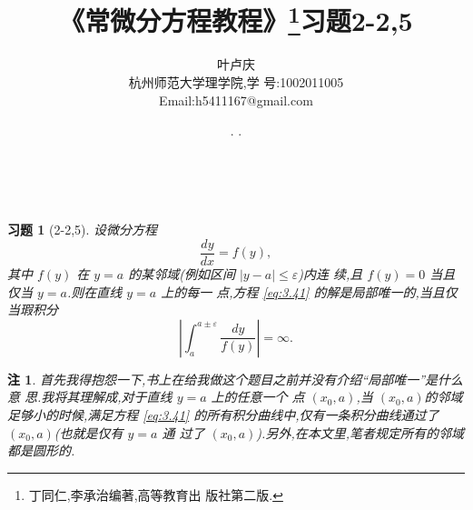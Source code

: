 \documentclass[a4paper, 12pt]{article} %
\makeatletter
\newtheorem*{cdtheorem}{习题}
\newenvironment{exercise}
{\bigskip\begin{mdframed}[backgroundcolor=gray!40,rightline=false,leftline=false,topline=false,bottomline=false]\begin{cdtheorem}}
    {\end{cdtheorem}\end{mdframed}\bigskip}
\newtheorem{ddtheorem}{注}
\newenvironment{remark}
{\bigskip\begin{mdframed}[backgroundcolor=gray!40,rightline=false,leftline=false,topline=false,bottomline=false]\begin{ddtheorem}}
    {\end{ddtheorem}\end{mdframed}\bigskip}
\renewcommand{\maketitle}{ %
  \renewcommand\refname{参考文献}
  \newcommand{\D}{\displaystyle}\newcommand{\ri}{\Rightarrow}
  \newcommand{\ds}{\displaystyle} \renewcommand{\ni}{\noindent}
  \newcommand{\pa}{\partial} \newcommand{\Om}{\Omega}
  \newcommand{\om}{\omega} \newcommand{\sik}{\sum_{i=1}^k}
  \newcommand{\vov}{\Vert\omega\Vert} \newcommand{\Umy}{U_{\mu_i,y^i}}
  \newcommand{\lamns}{\lambda_n^{^{\scriptstyle\sigma}}}
  \newcommand{\chiomn}{\chi_{_{\Omega_n}}}
  \newcommand{\ullim}{\underline{\lim}} \newcommand{\bsy}{\boldsymbol}
  \newcommand{\mvb}{\mathversion{bold}} \newcommand{\la}{\lambda}
  \newcommand{\La}{\Lambda} \newcommand{\va}{\varepsilon}
  \newcommand{\be}{\beta} \newcommand{\al}{\alpha}
  \newcommand{\dis}{\displaystyle} \newcommand{\R}{{\mathbb R}}
  \newcommand{\N}{{\mathbb N}} \newcommand{\cF}{{\mathcal F}}
  \newcommand{\gB}{{\mathfrak B}} \newcommand{\eps}{\epsilon}
  \begin{flushright} %
    {\LARGE\@title} %

    \vspace{50pt} %

    {\large\@author} %
    \\\@date %

    \vspace{40pt} %
  \end{flushright}
}
\makeatother
\begin{document}
\title{\textbf{《常微分方程教程》\footnote{丁同仁,李承治编著,高等教育出
      版社第二版.}习题2-2,5}}

\author{\small{叶卢庆}\\{\small{杭州师范大学理学院,学
      号:1002011005}}\\{\small{Email:h5411167@gmail.com}}} %
\renewcommand{\today}{\number\year. \number\month. \number\day}
\date{\today} %

\maketitle
\begin{exercise}[2-2,5]
  设微分方程
  \begin{equation}
    \label{eq:3.41}
    \frac{dy}{dx}=f(y),
  \end{equation}
  其中 $f(y)$ 在 $y=a$ 的某邻域(例如区间 $|y-a|\leq\varepsilon$)内连
  续,且 $f(y)=0$ 当且仅当 $y=a$.则在直线 $y=a$ 上的每一
  点,方程 \eqref{eq:3.41} 的解是局部唯一的,当且仅当瑕积分
$$
|\int_a^{a\pm \varepsilon}\frac{dy}{f(y)}|=\infty.
$$
\end{exercise}
\begin{remark}
  首先我得抱怨一下,书上在给我做这个题目之前并没有介绍“局部唯一”是什么意
  思.我将其理解成,对于直线 $y=a$ 上的任意一个
  点 $(x_0,a)$,当 $(x_0,a)$的邻域足够小的时候,满足方程 \eqref{eq:3.41}
  的所有积分曲线中,仅有一条积分曲线通过了 $(x_0,a)$(也就是仅有 $y=a$ 通
  过了 $(x_0,a)$).另外,在本文里,笔者规定所有的邻域都是圆形的.
\end{remark}
\begin{comment}
  \begin{remark}
    该题目有明显的物理意义.将 $x$ 看作时间,将 $y$ 看作质点在一条直线上
    的一维位置.则$\frac{dy}{dx}=f(y)$ 表示质点在直线上的一维速度.质点的
    速度在位置区间$[a-\varepsilon,a+\varepsilon]$ 上连续(这在物理中是自
    明的,速度不会突变.),且只有在位置 $y=a$ 的地方速度才为0.且质点的速度
    是位置的函
    数.我们知道,满足如上条件的质点可能有无数种运动方式.\\

    如果质点所有的运动方式都有如下特征:当质点还没达到 $y=a$ 这个位置,但
    是已经很接近$y=a$ 这个位置的时候,如果质点每接近 $y=a$ 这个位置相同
    的距离,所花费的时间会越来越长,最后是寸步难进(虽然始终在运动),即使
    向 $y=a$ 前进哪怕是很小很小的一段距离,所消耗的时间也会惊人地多,以至
    于无论给这个质点多长的时间,质点都将无法到达$y=a$ 这个位置,那么想要
    质点在别处不可能运动到 $y=a$ 这个位置,唯一能做的就是把质点直接放
    在 $y=a$ 这个地方保持静止.
  \end{remark}
\end{comment}
\end{document}
